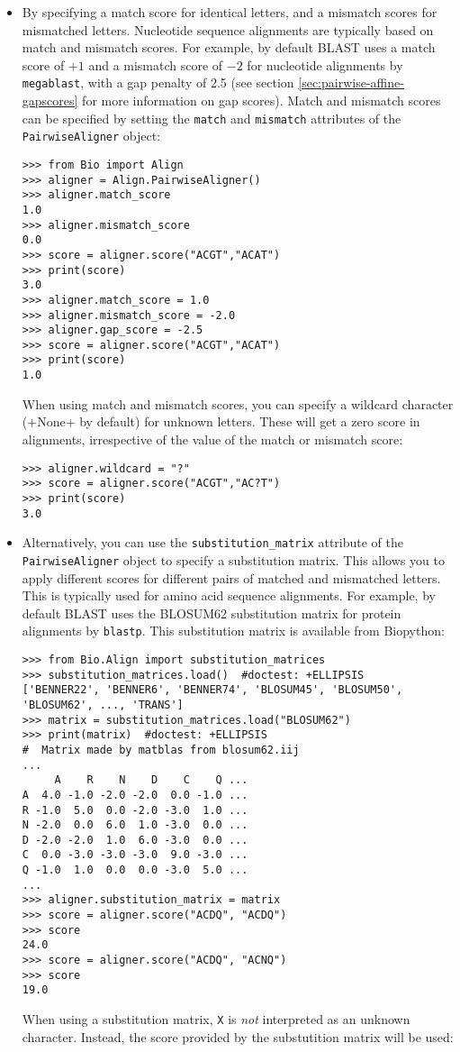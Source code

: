 \begin{itemize}
\item By specifying a match score for identical letters, and a mismatch scores for mismatched letters. Nucleotide sequence alignments are typically based on match and mismatch scores. For example, by default BLAST \cite{altschul1990} uses a match score of $+1$ and a mismatch score of $-2$ for nucleotide alignments by \verb+megablast+, with a gap penalty of 2.5 (see section \ref{sec:pairwise-affine-gapscores} for more information on gap scores). Match and mismatch scores can be specified by setting the \verb+match+ and \verb+mismatch+ attributes of the \verb+PairwiseAligner+ object:

\begin{verbatim}
>>> from Bio import Align
>>> aligner = Align.PairwiseAligner()
>>> aligner.match_score
1.0
>>> aligner.mismatch_score
0.0
>>> score = aligner.score("ACGT","ACAT")
>>> print(score)
3.0
>>> aligner.match_score = 1.0
>>> aligner.mismatch_score = -2.0
>>> aligner.gap_score = -2.5
>>> score = aligner.score("ACGT","ACAT")
>>> print(score)
1.0
\end{verbatim}
When using match and mismatch scores, you can specify a wildcard character (+None+ by default) for unknown letters. These will get a zero score in alignments, irrespective of the value of the match or mismatch score:
\begin{verbatim}
>>> aligner.wildcard = "?"
>>> score = aligner.score("ACGT","AC?T")
>>> print(score)
3.0
\end{verbatim}
\item
Alternatively, you can use the \verb+substitution_matrix+ attribute of the \verb+PairwiseAligner+ object to specify a substitution matrix. This allows you to apply different scores for different pairs of matched and mismatched letters. This is typically used for amino acid sequence alignments. For example, by default BLAST \cite{altschul1990} uses the BLOSUM62 substitution matrix for protein alignments by \verb+blastp+. This substitution matrix is available from Biopython:

\begin{verbatim}
>>> from Bio.Align import substitution_matrices
>>> substitution_matrices.load()  #doctest: +ELLIPSIS
['BENNER22', 'BENNER6', 'BENNER74', 'BLOSUM45', 'BLOSUM50', 'BLOSUM62', ..., 'TRANS']
>>> matrix = substitution_matrices.load("BLOSUM62")
>>> print(matrix)  #doctest: +ELLIPSIS
#  Matrix made by matblas from blosum62.iij
...
     A    R    N    D    C    Q ...
A  4.0 -1.0 -2.0 -2.0  0.0 -1.0 ...
R -1.0  5.0  0.0 -2.0 -3.0  1.0 ...
N -2.0  0.0  6.0  1.0 -3.0  0.0 ...
D -2.0 -2.0  1.0  6.0 -3.0  0.0 ...
C  0.0 -3.0 -3.0 -3.0  9.0 -3.0 ...
Q -1.0  1.0  0.0  0.0 -3.0  5.0 ...
...
>>> aligner.substitution_matrix = matrix
>>> score = aligner.score("ACDQ", "ACDQ")
>>> score
24.0
>>> score = aligner.score("ACDQ", "ACNQ")
>>> score
19.0
\end{verbatim}
When using a substitution matrix, \verb+X+ is {\em not} interpreted as an unknown character. Instead, the score provided by the substutition matrix will be used:


\end{itemize}
